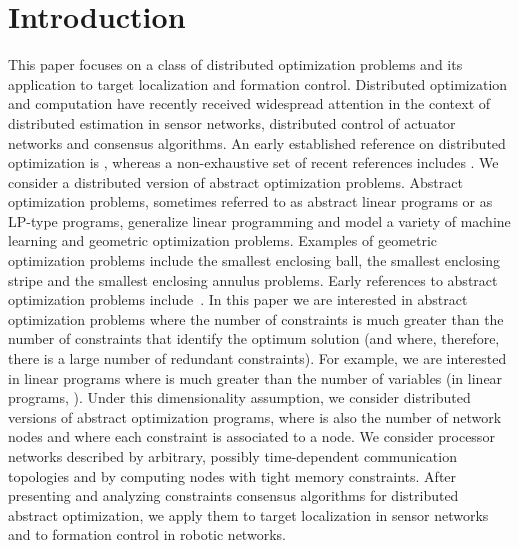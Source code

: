 \documentclass[onecolumn,journal,letterpaper]{IEEEtran}
\begin{document}
\section{Introduction}
This paper focuses on a class of distributed optimization problems and its
application to target localization and formation control.
Distributed optimization and computation have recently received widespread
attention in the context of distributed estimation in sensor networks,
distributed control of actuator networks and consensus algorithms. An early
established reference on distributed optimization is \cite{JNT-DPB-MA:86},
whereas a non-exhaustive set of recent references includes
\cite{NM-AJ:09,AN-AO-PAP:09,BJ-AS-MK-KHJ:08,DPP-MC:07}.
We consider a distributed version of abstract optimization problems.
Abstract optimization problems, sometimes referred to as abstract linear
programs or as LP-type programs, generalize linear programming and model a
variety of machine learning and geometric optimization problems. Examples
of geometric optimization problems include the smallest enclosing ball, the
smallest enclosing stripe and the smallest enclosing annulus problems.
Early references to abstract optimization problems
include~\cite{JM-MS-EW:96,BG:95,MG:95}.
In this paper we are interested in abstract optimization problems where the
number of constraints  is much greater than the number of constraints
 that identify the optimum solution (and where, therefore, there is
a large number of redundant constraints). For example, we are interested in
linear programs where  is much greater than the number of variables 
(in linear programs, ). Under this dimensionality assumption,
we consider distributed versions of abstract optimization programs, where
 is also the number of network nodes and where each constraint is
associated to a node. We consider processor networks described by
arbitrary, possibly time-dependent communication topologies and by
computing nodes with tight memory constraints. After presenting and
analyzing constraints consensus algorithms for distributed abstract
optimization, we apply them to target localization in sensor networks and
to formation control in robotic networks.
\end{document}
